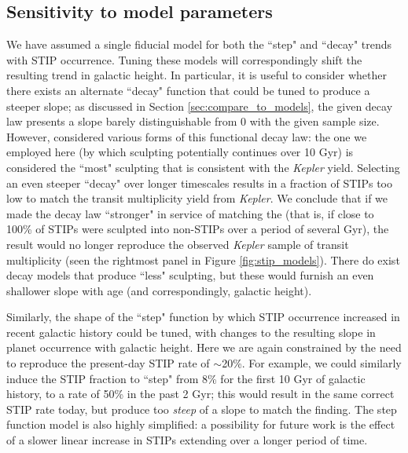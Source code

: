 \documentclass[twocolumn]{aastex631}
\begin{document}
\subsection{Sensitivity to model parameters}
We have assumed a single fiducial model for both the ``step" and ``decay" trends with STIP occurrence. Tuning these models will correspondingly shift the resulting trend in galactic height. In particular, it is useful to consider whether there exists an alternate ``decay" function that could be tuned to produce a steeper slope; as discussed in Section \ref{sec:compare_to_models}, the given decay law presents a slope barely distinguishable from 0 with the given sample size. However, \cite{lam_ages_2024} considered various forms of this functional decay law: the one we employed here (by which sculpting potentially continues over 10 Gyr) is considered the ``most" sculpting that is consistent with the \textit{Kepler} yield. Selecting an even steeper ``decay" over longer timescales results in a fraction of STIPs too low to match the transit multiplicity yield from \textit{Kepler}. We conclude that if we made the decay law ``stronger" in service of matching the \cite{zink_scaling_2023} (that is, if close to 100\% of STIPs were sculpted into non-STIPs over a period of several Gyr), the result would no longer reproduce the observed \textit{Kepler} sample of transit multiplicity (seen the rightmost panel in Figure \ref{fig:stip_models}). There do exist decay models that produce ``less" sculpting, but these would furnish an even shallower slope with age (and correspondingly, galactic height). 

Similarly, the shape of the ``step" function by which STIP occurrence increased in recent galactic history could be tuned, with changes to the resulting slope in planet occurrence with galactic height. Here we are again constrained by the need to reproduce the present-day STIP rate of $\sim$20\%. For example, we could similarly induce the STIP fraction to ``step" from 8\% for the first 10 Gyr of galactic history, to a rate of 50\% in the past 2 Gyr; this would result in the same correct STIP rate today, but produce too \textit{steep} of a slope to match the \cite{zink_scaling_2023} finding. The step function model is also highly simplified: a possibility for future work is the effect of a slower linear increase in STIPs extending over a longer period of time. 
\end{document}
